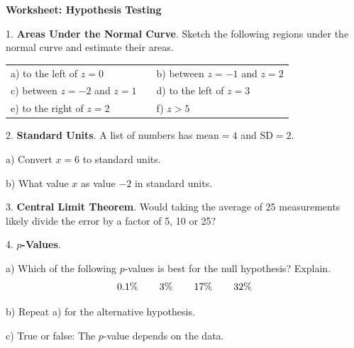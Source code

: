\documentclass[10pt]{article}
\begin{document}
{\setlength{\baselineskip}{1.05\baselineskip}
\begin{center}
\textbf{\large  Worksheet:  Hypothesis Testing}
\end{center}

1. \textbf{Areas Under the Normal Curve}.
Sketch the following regions under the normal curve and estimate their areas.\vspace{-3pt}
\begin{center}
\begin{tabular}{lcl}
a) to the left of $z=0$ &\hspace{2in} & b) between $z=-1$ and $z=2$\\[.7in]
c) between $z=-2$ and $z=1$ &\hspace{2in} & d) to the left of $z=3$ \\[.7in]
e) to the right of $z=2$ &\hspace{2in} & f) $z>5$\\[.7in]
\end{tabular}
\end{center}

2. \textbf{Standard Units}. A list of numbers has $\mbox{mean}=4$ and $\mbox{SD}=2$.

\hspace{10pt} a) Convert $x=6$ to standard units.
\vspace{.5in}

\hspace{10pt} b) What value $x$ as value $-2$ in standard units.
\vspace{.5in}


3. \textbf{Central Limit Theorem}.
Would taking the average of 25 measurements likely divide the error by a factor of 5, 10 or 25?
\vspace{.3in}

4. \textbf{$p$-Values}.

\hspace{10pt} a) Which of the following $p$-values is best for the
null hypothesis? Explain.
\[0.1\%\hspace{.3in} 3\%\hspace{.3in} 17\%\hspace{.3in} 32\%\]
\vspace{.1in}

\hspace{10pt} b) Repeat a) for the alternative hypothesis.
\vspace{.3in}


\hspace{10pt} c) True or false:  The $p$-value depends on the data.
\vfill


}
\end{document}
